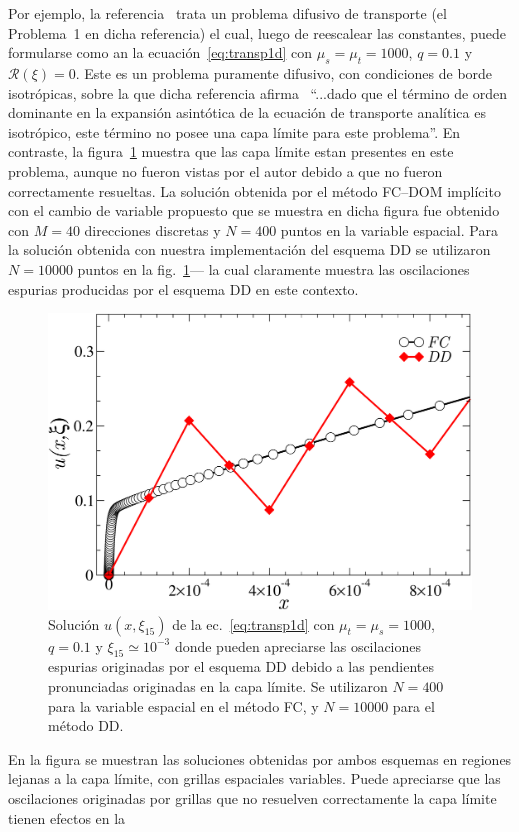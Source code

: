 Por ejemplo, la referencia~\cite{Larsen1987} trata un problema 
difusivo de transporte (el Problema~1 en dicha referencia) 
el cual, luego de reescalear las constantes, puede formularse 
como an la ecuación~\eqref{eq:transp1d} con $\mu_s=\mu_t=1000$,
 $q=0.1$ y $\mathcal{R}(\xi)=0$. Este es un problema 
 puramente difusivo, con condiciones de borde isotrópicas, 
 sobre la que dicha referencia afirma~\cite[pp. 317]{Larsen1987} 
 ``...dado que el término de orden dominante en la expansión asintótica 
 de la ecuación de transporte analítica es isotrópico, 
 este término no posee una capa límite para este problema''. 
 En contraste, la figura~\ref{fig:DDlayer} muestra que 
 las capa límite estan presentes en este problema, aunque 
 no fueron vistas por el autor debido a que no fueron correctamente 
 resueltas. La solución obtenida por el método FC--DOM implícito 
 con el cambio de variable propuesto que se muestra en dicha figura 
 fue obtenido con $M=40$ direcciones discretas y $N=400$ puntos 
 en la variable espacial. Para la solución obtenida con nuestra implementación 
 del esquema DD se utilizaron $N=10000$ puntos en la fig.~\ref{fig:DDlayer}---
 la cual claramente muestra las oscilaciones espurias producidas 
 por el esquema DD en este contexto.
\begin{figure}[h!]
\centering
  \includegraphics[width=0.5\linewidth]{figuras/layerlar.pdf}
  \caption{Solución $u(x,\xi_{15})$ de la ec.~\eqref{eq:transp1d} 
  con $\mu_t=\mu_s=1000$, $q=0.1$ y $\xi_{\text{15}} \simeq 10^{-3}$
  donde pueden apreciarse las oscilaciones espurias originadas 
  por el esquema DD debido a las pendientes pronunciadas originadas 
  en la capa límite. Se utilizaron $N=400$ para la variable espacial 
  en el método FC, y  $N=10000$ para el método DD.}
 \label{fig:DDlayer}
\end{figure}
En la figura se muestran las soluciones obtenidas por ambos esquemas 
en regiones lejanas a la capa límite, con grillas espaciales variables. 
Puede apreciarse que las oscilaciones originadas por grillas que 
no resuelven correctamente la capa límite tienen efectos en la 
